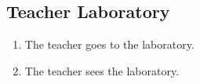 \subsection{Teacher Laboratory}

\begin{enumerate}
    \item The teacher goes to the laboratory.
    \item The teacher sees the laboratory.
\end{enumerate}
